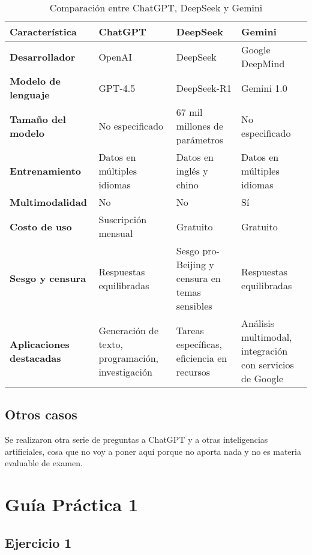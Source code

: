 \begin{table}[H]
    \centering
    \renewcommand{\arraystretch}{1.3}
    \begin{tabular}{|l|p{3cm}|p{3cm}|p{3cm}|}
        \hline
        \textbf{Característica} & \textbf{ChatGPT} & \textbf{DeepSeek} & \textbf{Gemini} \\
        \hline
        \textbf{Desarrollador} & OpenAI & DeepSeek & Google DeepMind \\
        \hline
        \textbf{Modelo de lenguaje} & GPT-4.5 & DeepSeek-R1 & Gemini 1.0 \\
        \hline
        \textbf{Tamaño del modelo} & No especificado & 67 mil millones de parámetros & No especificado \\
        \hline
        \textbf{Entrenamiento} & Datos en múltiples idiomas & Datos en inglés y chino & Datos en múltiples idiomas \\
        \hline
        \textbf{Multimodalidad} & No & No & Sí \\
        \hline
        \textbf{Costo de uso} & Suscripción mensual & Gratuito & Gratuito \\
        \hline
        \textbf{Sesgo y censura} & Respuestas equilibradas & Sesgo pro-Beijing y censura en temas sensibles & Respuestas equilibradas \\
        \hline
        \textbf{Aplicaciones destacadas} & Generación de texto, programación, investigación & Tareas específicas, eficiencia en recursos & Análisis multimodal, integración con servicios de Google \\
        \hline
    \end{tabular}
    \caption{Comparación entre ChatGPT, DeepSeek y Gemini}
    \label{tab:comparacion_modelos}
\end{table}

\subsection{Otros casos}

Se realizaron otra serie de preguntas a ChatGPT y a otras inteligencias artificiales, cosa que no voy a poner aquí porque no aporta nada y no es materia evaluable de examen.

\section{Guía Práctica 1}

\subsection{Ejercicio 1}

